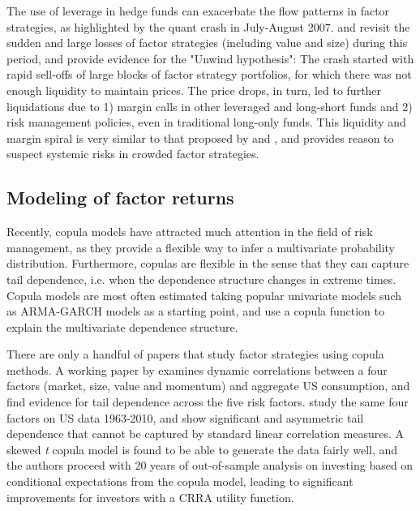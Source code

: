 The use of leverage in hedge funds can exacerbate the flow patterns in factor strategies, as highlighted by the quant crash in July-August 2007. \textcite{KhandaniLo2011} and \textcite{KhandaniLo2007} revisit the sudden and large losses of factor strategies (including value and size) during this period, and provide evidence for the "Unwind hypothesis": The crash started with rapid sell-offs of large blocks of factor strategy portfolios, for which there was not enough liquidity to maintain prices. The price drops, in turn, led to further liquidations due to 1) margin calls in other leveraged and long-short funds and 2) risk management policies, even in traditional long-only funds. This liquidity and margin spiral is very similar to that proposed by \textcite{Brunnermeier2009} and \textcite{BrunnermeierPedersen2009}, and provides reason to suspect systemic risks in crowded factor strategies.


\subsection{Modeling of factor returns}

Recently, copula models have attracted much attention in the field of risk management, as they provide a flexible way to infer a multivariate probability distribution. Furthermore, copulas are flexible in the sense that they can capture tail dependence, i.e. when the dependence structure changes in extreme times. Copula models are most often estimated taking popular univariate models such as ARMA-GARCH models as a starting point, and use a copula function to explain the multivariate dependence structure.

There are only a handful of papers that study factor strategies using copula methods. A working paper by \textcite{CholleteNing2012} examines dynamic correlations between a four factors (market, size, value and momentum) and aggregate US consumption, and find evidence for tail dependence across the five risk factors. \textcite{ChristoffersenLanglois2013} study the same four factors on US data 1963-2010, and show significant and asymmetric tail dependence that cannot be captured by standard linear correlation measures. A skewed \textit{t} copula model is found to be able to generate the data fairly well, and the authors proceed with 20 years of out-of-sample analysis on investing based on conditional expectations from the copula model, leading to significant improvements for investors with a CRRA utility function.

